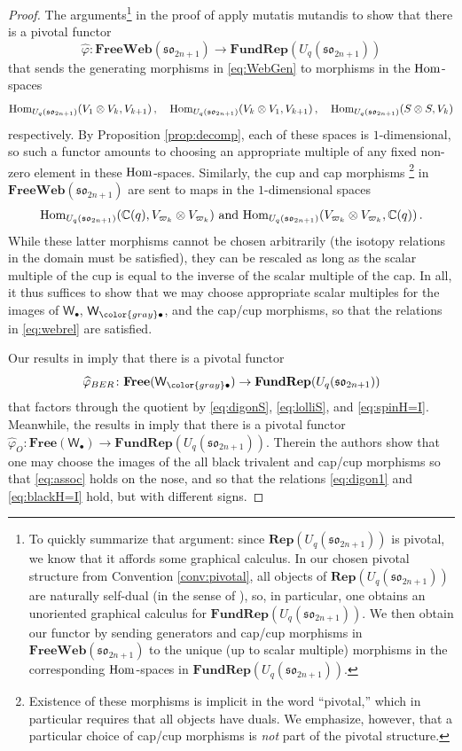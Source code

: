 \documentclass[10pt]{amsart}
\newcommand{\gray}[1]{{\color{gray}#1}}
\numberwithin{equation}{section}
\theoremstyle{definition}
\newcommand{\Hom}{{\rm Hom}}
\renewcommand{\to}{\rightarrow}
\let\hat=\widehat
\def\C{{\mathbb C}}
\newcommand{\son}[1][2n+1]{\mathfrak{so}_{#1}}
\newcommand{\Rep}{\mathbf{Rep}}
\newcommand{\FRep}{\mathbf{FundRep}}
\newcommand{\FreeWeb}{\mathbf{FreeWeb}}
\newcommand{\Free}{\mathbf{Free}}
\begin{document}
\begin{proof}
The arguments\footnote{To quickly summarize that argument: 
since $\Rep(U_q(\son))$ is pivotal, we know that it affords some graphical calculus.
In our chosen pivotal structure from Convention \ref{conv:pivotal}, 
all objects of $\Rep(U_q(\son))$
are naturally self-dual (in the sense of \cite{Sel2}), 
so, in particular, one obtains an unoriented graphical calculus for $\FRep(U_q(\son))$.
We then obtain our functor by sending generators and cap/cup morphisms 
in $\FreeWeb(\son)$
to the unique (up to scalar multiple) morphisms in the corresponding 
$\Hom$-spaces in $\FRep(U_q(\son))$.} 
in the proof of \cite[Theorem 5.1]{BERT} apply 
mutatis mutandis to show that there is a pivotal functor 
\begin{equation}
	\label{eq:Free}
\hat{\varphi} \colon \FreeWeb(\son) \to \FRep(U_q(\son))
	\end{equation}
that sends the generating morphisms in \eqref{eq:WebGen} 
to morphisms in the $\Hom$-spaces
\[
\Hom_{U_q(\son)}(V_1 \otimes V_k,V_{k+1}) \, , \quad 
\Hom_{U_q(\son)}(V_k \otimes V_1,V_{k+1}) \, , \quad 
\Hom_{U_q(\son)}(S \otimes S, V_k)
\]
respectively. 
By Proposition \ref{prop:decomp}, 
each of these spaces is $1$-dimensional,
so such a functor amounts to choosing an appropriate multiple of any 
fixed non-zero element in these $\Hom$-spaces.
Similarly, the cup and cap morphisms
\footnote{Existence of these morphisms is implicit in the word ``pivotal,'' which in particular requires that all objects have duals. 
We emphasize, however, that a particular choice of cap/cup morphisms is \emph{not} part of the pivotal structure.}
in $\FreeWeb(\son)$ are sent to maps in the $1$-dimensional spaces
\[
\Hom_{U_q(\son)}(\C(q), V_{\varpi_k} \otimes V_{\varpi_k}) 
\text{ and }
\Hom_{U_q(\son)}(V_{\varpi_k} \otimes V_{\varpi_k}, \C(q)) \, . 
\]
While these latter morphisms cannot be chosen arbitrarily (the isotopy relations in the domain must be satisfied), 
they can be rescaled as long as the scalar multiple of the cup is equal 
to the inverse of the scalar multiple of the cap.
In all, it thus suffices to show that we may choose appropriate scalar multiples for 
the images of $\mathsf{W}_{\bullet}$, $\mathsf{W}_{\gray{\bullet}}$, and the cap/cup morphisms, so that 
the relations in \eqref{eq:webrel} are satisfied.

Our results in \cite[\S 4.2]{BER} imply that there is a pivotal functor
\begin{equation}
	\label{eq:FreeSpin}
\hat{\varphi}_{BER} \colon \Free(\mathsf{W}_{\gray{\bullet}}) \to \FRep(U_q(\son))
	\end{equation}
that factors through the quotient by 
\eqref{eq:digonS}, 
\eqref{eq:lolliS},
and \eqref{eq:spinH=I}.
Meanwhile, 
the results in \cite{BodWu} imply that there is a pivotal functor 
$\hat{\varphi}_{O} \colon \Free(\mathsf{W}_{\bullet}) \to \FRep(U_q(\son))$.
Therein the authors show that one may choose the images of the 
all black trivalent and cap/cup morphisms so that 
\eqref{eq:assoc} 
holds on the nose, 
and so that the relations \eqref{eq:digon1} and \eqref{eq:blackH=I} hold,
but with different signs. 


\end{proof}
\end{document}
